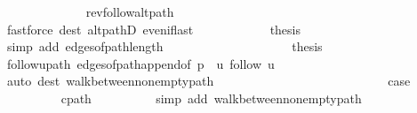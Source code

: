 \begin{isabellebody}
\ \ \ \ \ \ \ \ \ \ \ \ \isamarkupfalse%
\ rev{\isacharunderscore}{\kern0pt}follow{\isacharunderscore}{\kern0pt}alt{\isacharunderscore}{\kern0pt}path\isanewline
\ \ \ \ \ \ \ \ \ \ \ \ \isamarkupfalse%
\ {\isacharparenleft}{\kern0pt}fastforce\ dest{\isacharcolon}{\kern0pt}\ alt{\isacharunderscore}{\kern0pt}pathD{\isacharparenleft}{\kern0pt}{}{\isacharparenright}{\kern0pt}\ even{\isacharunderscore}{\kern0pt}if{\isacharunderscore}{\kern0pt}last{\isacharparenright}{\kern0pt}\isanewline
\ \ \ \ \ \ \ \ \ \ \isamarkupfalse%
\ {\isacharquery}{\kern0pt}thesis\isanewline
\ \ \ \ \ \ \ \ \ \ \ \ \isamarkupfalse%
\ {\isacharparenleft}{\kern0pt}simp\ add{\isacharcolon}{\kern0pt}\ edges{\isacharunderscore}{\kern0pt}of{\isacharunderscore}{\kern0pt}path{\isacharunderscore}{\kern0pt}length{\isacharparenright}{\kern0pt}\isanewline
\ \ \ \ \ \ \ \ \isamarkupfalse%
\isanewline
\ \ \ \ \ \ \ \ \isamarkupfalse%
\ \isamarkupfalse%
\ {\isacharquery}{\kern0pt}thesis\isanewline
\ \ \ \ \ \ \ \ \ \ \isamarkupfalse%
\ follow{\isacharunderscore}{\kern0pt}u{\isacharunderscore}{\kern0pt}path\ edges{\isacharunderscore}{\kern0pt}of{\isacharunderscore}{\kern0pt}path{\isacharunderscore}{\kern0pt}append{\isacharunderscore}{\kern0pt}{}{\isacharbrackleft}{\kern0pt}of\ {\isachardoublequoteopen}p\ {\isacharat}{\kern0pt}\ {\isacharbrackleft}{\kern0pt}u{\isacharbrackright}{\kern0pt}{\isachardoublequoteclose}\ {\isachardoublequoteopen}follow\ u{\isachardoublequoteclose}{\isacharbrackright}{\kern0pt}\isanewline
\ \ \ \ \ \ \ \ \ \ \isamarkupfalse%
\ {\isacharparenleft}{\kern0pt}auto\ dest{\isacharcolon}{\kern0pt}\ walk{\isacharunderscore}{\kern0pt}between{\isacharunderscore}{\kern0pt}nonempty{\isacharunderscore}{\kern0pt}path{\isacharparenleft}{\kern0pt}{}{\isacharparenright}{\kern0pt}{\isacharparenright}{\kern0pt}\isanewline
\ \ \ \ \ \ \isamarkupfalse%
\isanewline
\ \ \ \ \isamarkupfalse%
\isanewline
\ \ \ \ \ \ \isamarkupfalse%
\ {}\isanewline
\ \ \ \ \ \ \isamarkupfalse%
\ {\isacharquery}{\kern0pt}case\isanewline
\ \ \ \ \ \ \ \ \isamarkupfalse%
\ c{\isacharunderscore}{\kern0pt}path\isanewline
\ \ \ \ \ \ \ \ \isamarkupfalse%
\ {\isacharparenleft}{\kern0pt}simp\ add{\isacharcolon}{\kern0pt}\ walk{\isacharunderscore}{\kern0pt}between{\isacharunderscore}{\kern0pt}nonempty{\isacharunderscore}{\kern0pt}path{\isacharparenleft}{\kern0pt}{}{\isacharcomma}{\kern0pt}\ {}{\isacharparenright}{\kern0pt}{\isacharparenright}{\kern0pt}\isanewline

\end{isabellebody}
